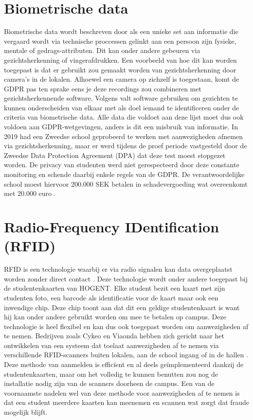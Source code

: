 \section{Biometrische data}  %
Biometrische data wordt beschreven door \textcite{Jeunen2025} als een unieke set aan informatie die vergaard wordt via technische proccessen gelinkt aan een persoon zijn fysieke, mentale of 
gedrags-attributen. Dit kan onder andere gebeuren via gezichtsherkenning of vingerafdrukken. Een voorbeeld van hoe dit kan worden toegepast is dat er gebruikt zou gemaakt worden van gezichtsherkenning door camera's in de lokalen. Alhoewel een camera op zichzelf is toegestaan, komt de GDPR pas ten sprake eens je deze recordings zou combineren met gezichtsherkennende software. Volgens \textcite{Persoonsgegevens2025} valt software gebruiken om gezichten te kunnen onderscheiden van elkaar met als doel iemand te identificeren onder de criteria van biometrische data. Alle data die voldoet aan deze lijst moet dus ook voldoen aan GDPR-wetgevingen, anders is dit een misbruik van informatie. In 2019 had een Zweedse school geprobeerd te werken met aanwezigheden afnemen via gezichtsherkenning, maar er werd tijdens de proef periode vastgesteld door de Zweedse Data Protection Agreement (DPA) dat deze test moest stopgezet worden. De privacy van studenten werd niet gerespecteerd door deze constante monitoring en schende daarbij enkele regels van de GDPR. De verantwoordelijke school moest hiervoor 200.000 SEK betalen in schadevergoeding wat overeenkomt met 20.000 euro \autocite{Board2025}.

\section{Radio-Frequency IDentification (RFID)}  %
RFID is een technologie waarbij er via radio signalen kan data overgeplaatst worden zonder direct contact \autocite{Andrew}. Deze technologie wordt onder andere toegepast bij de studentenkaarten van HOGENT. Elke student bezit een kaart met zijn studenten foto, een barcode als identificatie voor de kaart maar ook een inwendige chip. Deze chip toont aan dat dit een geldige studentenkaart is want hij kan onder andere gebruikt worden om mee te betalen op campus. Deze technologie is heel flexibel en kan dus ook toegepast worden om aanwezigheden af te nemen. Bedrijven zoals Cykeo en Viaonda hebben zich gericht naar het ontwikkelen van een systeem dat toelaat aanwezigheden af te nemen via verschillende RFID-scanners buiten lokalen, aan de school ingang of in de hallen \autocites{ViaOnda2025}{Cykeo2025}. Deze methode van aanmelden is efficïent en al deels geïmplementeerd dankzij de studentenkaarten, maar om het volledig te kunnen benutten zou nog de installatie nodig zijn van de scanners doorheen de campus. Een van de voornaamste nadelen wel van deze methode voor aanwezigheden af te nemen is dat een student meerdere kaarten kan meenemen en scannen wat zorgt dat fraude mogelijk blijft.
